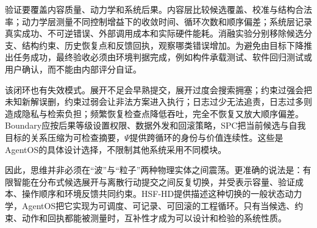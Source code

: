 验证要覆盖内容质量、动力学和系统后果。内容层比较候选覆盖、校准与结构合法率；动力学层测量不同控制增益下的收敛时间、循环次数和顺序偏差；系统层记录真实成功、不可逆错误、外部调用成本和实际硬件能耗。消融实验分别移除候选分支、结构约束、历史恢复点和反馈回执，观察哪类错误增加。为避免由目标下降推出任务成功，最终验收必须由环境判据完成，例如构件承载测试、软件回归测试或用户确认，而不能由内部评分自证。

该闭环也有失效模式。展开不足会早熟提交，展开过度会搜索拥塞；约束过强会把未知新解误删，约束过弱会让非法方案进入执行；日志过少无法追责，日志过多则造成隐私与检索负担；频繁恢复检查点降低吞吐，完全不恢复又放大顺序偏差。Boundary应按后果等级设置权限、数据外发和回滚策略，SPC把当前候选与自我目标的关系压缩为可检查摘要，$\Psi$提供跨循环的身份与价值连续性。这些是AgentOS的具体设计选择，不限制其他系统采用不同模块。

因此，思维并非必须在“波”与“粒子”两种物理实体之间震荡。更准确的说法是：有限智能在分布式候选展开与离散行动提交之间反复切换，并受表示容量、验证成本、操作顺序和环境反馈共同约束。HSF-HD提供描述这种切换的一般状态动力学，AgentOS把它实现为可调度、可记录、可回滚的工程循环。只有当候选、约束、动作和回执都能被测量时，互补性才成为可以设计和检验的系统性质。

